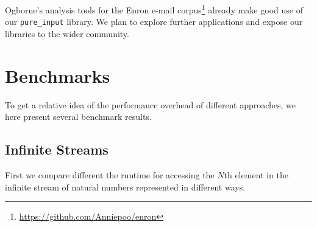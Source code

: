 \documentclass{new_tlp}
\begin{document}
Ogborne's analysis tools for the Enron e-mail
corpus\footnote{\url{https://github.com/Anniepoo/enron}} already make good use
of our {\tt pure\_input} library. We plan to explore further applications and
expose our libraries to the wider community.





\appendix

\section{Benchmarks}

To get a relative idea of the performance overhead of different approaches,
we here present several benchmark results.

\subsection{Infinite Streams}

First we compare different the runtime for accessing the $N$th element in the
infinite stream of natural numbers represented in different ways.
\end{document}
